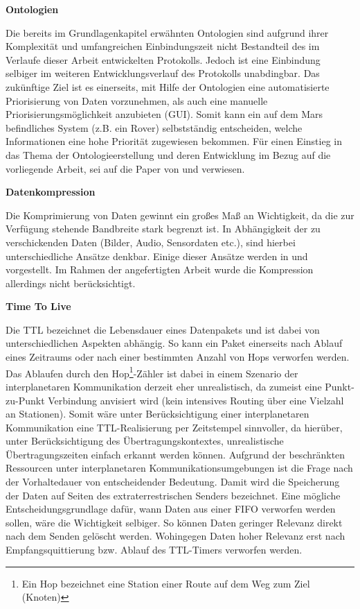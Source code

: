 \label{sec:Vorueberlegung}

\textbf{Ontologien}

Die bereits im Grundlagenkapitel erw{\"a}hnten Ontologien sind aufgrund ihrer
Komplexit{\"a}t und umfangreichen Einbindungszeit nicht Bestandteil des im
Verlaufe dieser Arbeit entwickelten Protokolls. Jedoch ist eine Einbindung
selbiger im weiteren Entwicklungsverlauf des Protokolls unabdingbar. Das
zuk{\"u}nftige Ziel ist es einerseits, mit Hilfe der Ontologien eine
automatisierte Priorisierung von Daten vorzunehmen, als auch eine manuelle
Priorisierungsm{\"o}glichkeit anzubieten (\gls{GUI}). Somit kann ein auf dem
Mars befindliches System (z.B. ein Rover) selbstst{\"a}ndig entscheiden, welche
Informationen eine hohe Priorit{\"a}t zugewiesen bekommen. F{\"u}r einen
Einstieg in das Thema der Ontologieerstellung und deren Entwicklung im Bezug
auf die vorliegende Arbeit, sei auf die Paper von \cite{Noy2000} und \cite{Daher} verwiesen.

\textbf{Datenkompression}

Die Komprimierung von Daten gewinnt ein gro{\ss}es Ma{\ss} an Wichtigkeit, da
die zur Verf{\"u}gung stehende Bandbreite stark begrenzt ist. In Abh{\"a}ngigkeit der zu
verschickenden Daten (Bilder, Audio, Sensordaten etc.), sind hierbei
unterschiedliche Ans{\"a}tze denkbar. Einige dieser Ans{\"a}tze werden in
\cite{Kiely2006} und \cite{Kiely2007} vorgestellt. Im Rahmen der angefertigten
Arbeit wurde die Kompression allerdings nicht ber{\"u}cksichtigt.

\textbf{Time To Live}

Die \gls{TTL} bezeichnet die Lebensdauer eines Datenpakets und ist
dabei von unterschiedlichen Aspekten abh{\"a}ngig. So kann ein Paket einerseits nach
Ablauf eines Zeitraums oder nach einer bestimmten Anzahl
von Hops verworfen werden. Das Ablaufen durch den Hop\footnote{Ein Hop
bezeichnet eine Station einer Route auf dem Weg zum Ziel (Knoten)}-Zähler
ist dabei in einem Szenario der interplanetaren Kommunikation derzeit eher
unrealistisch, da zumeist eine Punkt-zu-Punkt Verbindung anvisiert wird (kein
intensives Routing {\"u}ber eine Vielzahl an Stationen). Somit w{\"a}re unter
Ber{\"u}cksichtigung einer interplanetaren Kommunikation eine
\gls{TTL}-Realisierung per Zeitstempel sinnvoller, da hier{\"u}ber, unter Ber{\"u}cksichtigung des
{\"U}bertragungskontextes, unrealistische {\"U}bertragungszeiten einfach erkannt
werden k{\"o}nnen.
Aufgrund der beschr{\"a}nkten Ressourcen unter interplanetaren
Kommunikationsumgebungen ist die Frage nach der Vorhaltedauer von
entscheidender Bedeutung. Damit wird die Speicherung der
Daten auf Seiten des extraterrestrischen Senders bezeichnet. 
Eine m{\"o}gliche Entscheidungsgrundlage daf{\"u}r, wann Daten aus einer
\gls{FIFO} verworfen werden sollen, w{\"a}re die Wichtigkeit selbiger. So
k{\"o}nnen Daten geringer Relevanz direkt nach dem Senden gel{\"o}scht werden.
Wohingegen Daten hoher Relevanz erst nach Empfangsquittierung bzw. Ablauf des
\gls{TTL}-Timers verworfen werden.

